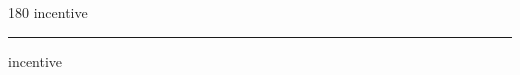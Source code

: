 
\begin{frame}
\begin{center}
\begin{turn}{180}
{\fontsize{2.5cm}{1em}\selectfont incentive}
\end{turn}
\vspace{1em}\par  
\hrule
\vspace{1em}\par  
{\fontsize{2.5cm}{1em}\selectfont incentive}
\end{center}
\end{frame}
